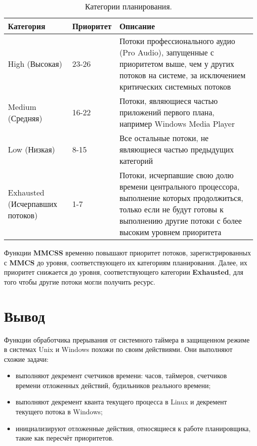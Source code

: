 \begin{table}[h]
	\caption{Категории планирования.}
	\begin{center}
		\begin{tabular}{|p{40mm}|p{30mm}|p{80mm}|}
			\hline
			\textbf{Категория} & \textbf{Приоритет} & \textbf{Описание} \\
			\hline
			High (Высокая) & 23-26 & Потоки профессионального аудио (Pro Audio), запущенные с приоритетом выше, чем у других потоков на системе, за исключением критических системных потоков \\
			\hline
			Medium (Средняя) & 16-22 & Потоки, являющиеся частью приложений первого плана, например Windows Media Player \\
			\hline
			Low (Низкая) & 8-15 & Все остальные потоки, не являющиеся частью предыдущих категорий \\
			\hline
			Exhausted (Исчерпавших потоков) & 1-7 & Потоки, исчерпавшие свою долю времени центрального процессора, выполнение которых продолжиться, только если не будут готовы к выполнению другие потоки с более высоким уровнем приоритета \\
			\hline
		\end{tabular}
	\end{center}
	\label{tab:plan}
\end{table}

Функции \textbf{MMCSS} временно повышают приоритет потоков, зарегистрированных с \textbf{MMCS} до уровня, соответствующего их категориям планирования. Далее, их приоритет снижается до уровня, соответствующего категории \textbf{Exhausted}, для того чтобы другие потоки могли получить ресурс.

\section*{Вывод}

Функции обработчика прерывания от системного таймера в защищенном режиме в системах Unix и Windows похожи по своим действиями. Они выполняют схожие задачи: 

\begin{itemize} 
	\item выполняют декремент счетчиков времени: часов, таймеров, счетчиков времени отложенных действий, будильников реального времени;
	\item выполняют декремент кванта текущего процесса в Linux и декремент текущего потока в Windows;
	\item инициализируют отложенные действия, относящиеся к работе планировщика, такие как пересчёт приоритетов.
\end{itemize} 

